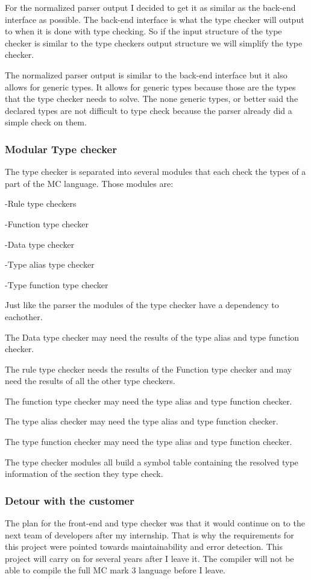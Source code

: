 For the normalized parser output I decided to get it as similar as the back-end interface as possible. The back-end interface is what the type checker will output to when it is done with type checking. So if the input structure of the type checker is similar to the type checkers output structure we will simplify the type checker.

The normalized parser output is similar to the back-end interface but it also allows for generic types. It allows for generic types because those are the types that the type checker needs to solve. The none generic types, or better said the declared types are not difficult to type check because the parser already did a simple check on them. 

\subsubsection{Modular Type checker}
The type checker is separated into several modules that each check the types of a part of the MC language. Those modules are:
	
	-Rule type checkers
	
	-Function type checker
	
	-Data type checker
	
	-Type alias type checker
	
	-Type function type checker

Just like the parser the modules of the type checker have a dependency to eachother. 
 
The Data type checker may need the results of the type alias and type function checker.

The rule type checker needs the results of the Function type checker and may need the results of all the other type checkers.

The function type checker may need the type alias and type function checker.

The type alias checker may need the type alias and type function checker.

The type function checker may need the type alias and type function checker.

The type checker modules all build a symbol table containing the resolved type information of the section they type check.


\subsubsection{Detour with the customer}
The plan for the front-end and type checker was that it would continue on to the next team of developers after my internship. That is why the requirements for this project were pointed towards maintainability and error detection. This project will carry on for several years after I leave it. The compiler will not be able to compile the full MC mark 3 language before I leave.

